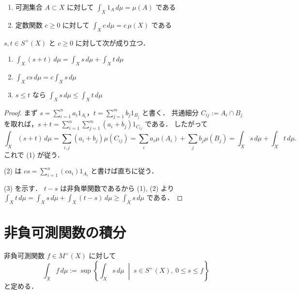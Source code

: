 \begin{example}
\begin{enumerate}
    \item 可測集合 $A \subset X$ に対して $\int_X 1_A\,d\mu = \mu(A)$ である
    \item 定数関数 $c \ge 0$ に対して $\int_X c\,d\mu = c\,\mu(X)$ である
\end{enumerate}
\end{example}

\begin{proposition}[単関数の基本性質]\label{prop:simple-function-integral-basic}
$s,t\in S^+(X)$ と $c \ge 0$ に対して次が成り立つ．
\begin{enumerate}
    \item $\int_X (s+t)\,d\mu = \int_X s\,d\mu + \int_X t\,d\mu$
    \item $\int_X cs\,d\mu = c \int_X s\,d\mu$
    \item $s \le t$ なら $\int_X s\,d\mu \le \int_X t\,d\mu$
\end{enumerate}
\end{proposition}
\begin{proof}
まず $s=\sum_{i=1}^n a_i 1_{A_i}$，$t=\sum_{j=1}^m b_j 1_{B_j}$ と書く．
共通細分 $C_{ij}:=A_i \cap B_j$ を取れば，$s+t=\sum_{i=1}^n \sum_{j=1}^m (a_i+b_j)1_{C_{ij}}$ である．
したがって
\[
\int_X (s+t)\,d\mu
=\sum_{i,j}(a_i+b_j)\mu(C_{ij})
=\sum_i a_i \mu(A_i)+\sum_j b_j \mu(B_j)
=\int_X s\,d\mu+\int_X t\,d\mu.
\]
これで (1) が従う．

(2) は $cs=\sum_{i=1}^n (ca_i)1_{A_i}$ と書けば直ちに従う．

(3) を示す．
$t-s$ は非負単関数であるから (1), (2) より
$\int_X t\,d\mu=\int_X s\,d\mu+\int_X (t-s)\,d\mu\ge \int_X s\,d\mu$ である．
\end{proof}

\section{非負可測関数の積分}

\begin{definition}[非負可測関数の積分]\label{def:nonnegative-lebesgue-integral}
非負可測関数 $f\in M^+(X)$ に対して
\[
\int_X f\,d\mu
:=
\sup\left\{\int_X s\,d\mu \;\middle|\; s\in S^+(X),\ 0 \le s \le f\right\}
\]
と定める．
\end{definition}

